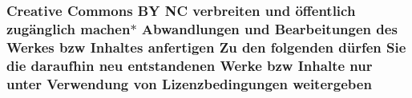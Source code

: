 \subsubsection[{\texorpdfstring{weitergeben}{weitergeben}}]{\setlength{\rightskip}{0pt plus 5cm}Creative Commons BY NC verbreiten und öffentlich zugänglich machen$\ast$ Abwandlungen und Bearbeitungen des Werkes bzw Inhaltes anfertigen Zu den folgenden dürfen Sie die daraufhin neu entstandenen Werke bzw Inhalte nur unter Verwendung von Lizenzbedingungen weitergeben}\hypertarget{LICENSE_8txt_a7950c2dd46b3c19b23fc5c2a2bd9d8fa}{}\label{LICENSE_8txt_a7950c2dd46b3c19b23fc5c2a2bd9d8fa}
